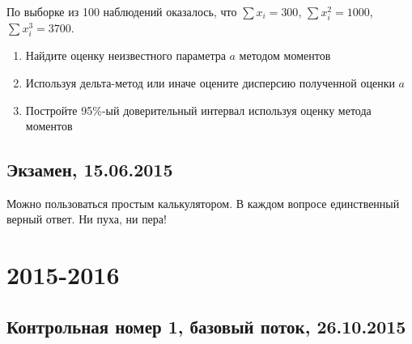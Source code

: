 \documentclass[12pt, a4paper]{article}\usepackage[]{graphicx}\usepackage[]{color}
\begin{document}
По выборке из 100 наблюдений оказалось, что $\sum x_i =300$, $\sum x_i^2=1000$, $\sum x_i^3=3700$.

\begin{enumerate}
\item Найдите оценку неизвестного параметра $a$ методом моментов
\item Используя дельта-метод или иначе оцените дисперсию полученной оценки $a$
\item Постройте 95\%-ый доверительный интервал используя оценку метода моментов
\end{enumerate}


\subsection{Экзамен, 15.06.2015}



\vspace{3ex}

Можно пользоваться простым калькулятором.  В каждом вопросе единственный верный ответ. Ни пуха, ни пера!

\vspace{3ex}




\section{2015-2016}




\subsection{Контрольная номер 1, базовый поток, 26.10.2015}
\end{document}
